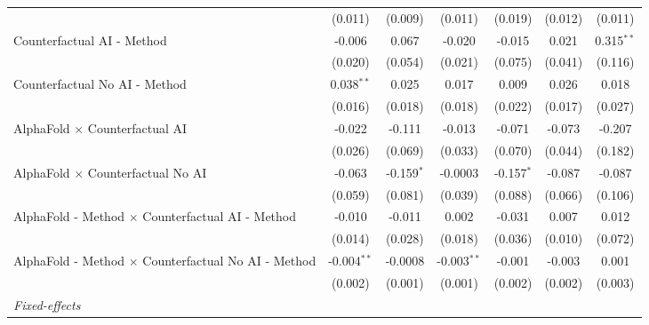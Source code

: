\begin{tabular}{lcccccc}
                                                              & (0.011)       & (0.009)       & (0.011)       & (0.019)      & (0.012)       & (0.011)\\   
   Counterfactual AI - Method                                 & -0.006        & 0.067         & -0.020        & -0.015       & 0.021         & 0.315$^{**}$\\   
                                                              & (0.020)       & (0.054)       & (0.021)       & (0.075)      & (0.041)       & (0.116)\\   
   Counterfactual No AI - Method                              & 0.038$^{**}$  & 0.025         & 0.017         & 0.009        & 0.026         & 0.018\\   
                                                              & (0.016)       & (0.018)       & (0.018)       & (0.022)      & (0.017)       & (0.027)\\   
   AlphaFold $\times$ Counterfactual AI                       & -0.022        & -0.111        & -0.013        & -0.071       & -0.073        & -0.207\\   
                                                              & (0.026)       & (0.069)       & (0.033)       & (0.070)      & (0.044)       & (0.182)\\   
   AlphaFold $\times$ Counterfactual No AI                    & -0.063        & -0.159$^{*}$  & -0.0003       & -0.157$^{*}$ & -0.087        & -0.087\\   
                                                              & (0.059)       & (0.081)       & (0.039)       & (0.088)      & (0.066)       & (0.106)\\   
   AlphaFold - Method $\times$ Counterfactual AI - Method     & -0.010        & -0.011        & 0.002         & -0.031       & 0.007         & 0.012\\   
                                                              & (0.014)       & (0.028)       & (0.018)       & (0.036)      & (0.010)       & (0.072)\\   
   AlphaFold - Method $\times$ Counterfactual No AI - Method  & -0.004$^{**}$ & -0.0008       & -0.003$^{**}$ & -0.001       & -0.003        & 0.001\\   
                                                              & (0.002)       & (0.001)       & (0.001)       & (0.002)      & (0.002)       & (0.003)\\   
   \midrule
   \emph{Fixed-effects}\\

\end{tabular}
